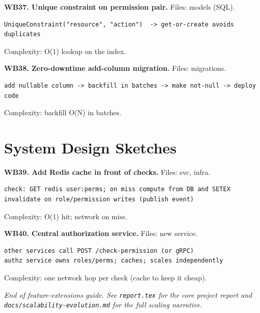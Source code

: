 \documentclass[11pt,a4paper]{report}
\begin{document}
\textbf{WB37. Unique constraint on permission pair.} Files: models (SQL).
\begin{lstlisting}
UniqueConstraint("resource", "action")  -> get-or-create avoids duplicates
\end{lstlisting}
Complexity: O(1) lookup on the index.

\textbf{WB38. Zero-downtime add-column migration.} Files: migrations.
\begin{lstlisting}
add nullable column -> backfill in batches -> make not-null -> deploy code
\end{lstlisting}
Complexity: backfill O(N) in batches.

\section{System Design Sketches}

\textbf{WB39. Add Redis cache in front of checks.} Files: svc, infra.
\begin{lstlisting}
check: GET redis user:perms; on miss compute from DB and SETEX
invalidate on role/permission writes (publish event)
\end{lstlisting}
Complexity: O(1) hit; network on miss.

\textbf{WB40. Central authorization service.} Files: new service.
\begin{lstlisting}
other services call POST /check-permission (or gRPC)
authz service owns roles/perms; caches; scales independently
\end{lstlisting}
Complexity: one network hop per check (cache to keep it cheap).

\vspace{1em}
\begin{center}
\textit{End of feature-extensions guide. See \texttt{report.tex} for the core
project report and \texttt{docs/scalability-evolution.md} for the full scaling
narrative.}
\end{center}
\end{document}
